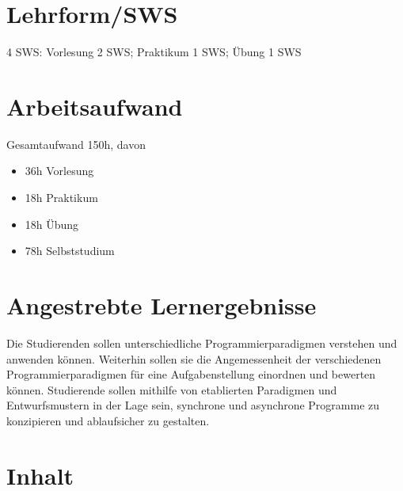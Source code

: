 \hypertarget{lehrformswspathlabelmi-2017modulbeschreibungen-bachelorba_paradigmen-der-programmierung}{%
\section*{Lehrform/SWS\label{/mi-2017/modulbeschreibungen-bachelor/BA_Paradigmen-der-Programmierung}}\label{lehrformswspathlabelmi-2017modulbeschreibungen-bachelorba_paradigmen-der-programmierung}}

4 SWS: Vorlesung 2 SWS; Praktikum 1 SWS; Übung 1 SWS

\hypertarget{arbeitsaufwandpathlabelmi-2017modulbeschreibungen-bachelorba_paradigmen-der-programmierung}{%
\section*{Arbeitsaufwand\label{/mi-2017/modulbeschreibungen-bachelor/BA_Paradigmen-der-Programmierung}}\label{arbeitsaufwandpathlabelmi-2017modulbeschreibungen-bachelorba_paradigmen-der-programmierung}}

Gesamtaufwand 150h, davon

\begin{itemize}
\tightlist
\item
  36h Vorlesung
\item
  18h Praktikum
\item
  18h Übung
\item
  78h Selbststudium
\end{itemize}

\hypertarget{angestrebte-lernergebnissepathlabelmi-2017modulbeschreibungen-bachelorba_paradigmen-der-programmierung}{%
\section*{Angestrebte
Lernergebnisse\label{/mi-2017/modulbeschreibungen-bachelor/BA_Paradigmen-der-Programmierung}}\label{angestrebte-lernergebnissepathlabelmi-2017modulbeschreibungen-bachelorba_paradigmen-der-programmierung}}

Die Studierenden sollen unterschiedliche Programmierparadigmen verstehen
und anwenden können. Weiterhin sollen sie die Angemessenheit der
verschiedenen Programmierparadigmen für eine Aufgabenstellung einordnen
und bewerten können. Studierende sollen mithilfe von etablierten
Paradigmen und Entwurfsmustern in der Lage sein, synchrone und
asynchrone Programme zu konzipieren und ablaufsicher zu gestalten.

\hypertarget{inhaltpathlabelmi-2017modulbeschreibungen-bachelorba_paradigmen-der-programmierung}{%
\section*{Inhalt\label{/mi-2017/modulbeschreibungen-bachelor/BA_Paradigmen-der-Programmierung}}\label{inhaltpathlabelmi-2017modulbeschreibungen-bachelorba_paradigmen-der-programmierung}}

